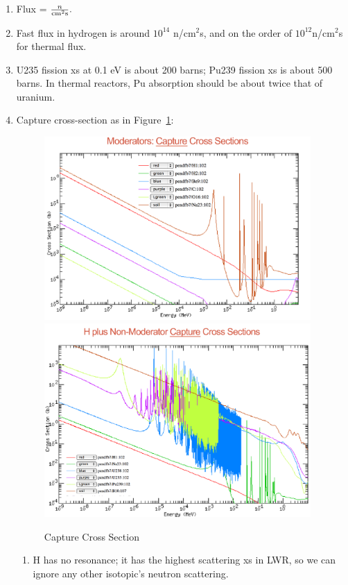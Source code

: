 \documentclass{school-22.211-notes}
\begin{document}
\begin{enumerate}
\item Flux = $\frac{n}{\mathrm{cm}^2 \mathrm{s}}.$

\item Fast flux in hydrogen is around $10^{14}$ n/cm$^2$s, and on the order of $10^{12}$n/cm$^2$s for thermal flux. 

\item U235 fission xs at 0.1 eV is about 200 barns; Pu239 fission xs is about 500 barns. In thermal reactors, Pu absorption should be about twice that of uranium. 

\item Capture cross-section as in Figure~\ref{capture-xs}: 
\begin{figure}
  \centering
  \includegraphics[width=4in]{images/capture-xs.png}
  \\
  \includegraphics[width=4in]{images/capture-xs-2.png}
  \caption{Capture Cross Section} \label{capture-xs}
\end{figure}
\begin{enumerate}
\item H has no resonance; it has the highest scattering xs in LWR, so we can ignore any other isotopic's neutron scattering.   

\end{enumerate}
\end{enumerate}
\end{document}
